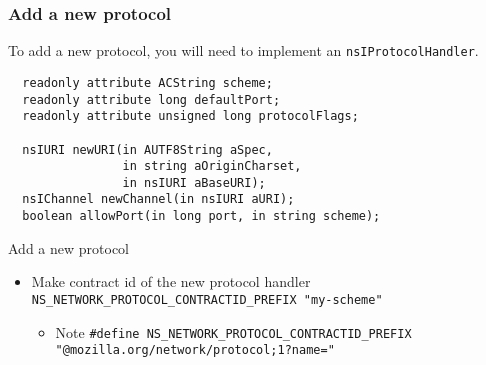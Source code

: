 \documentclass{beamer}
\begin{document}
\begin{frame}[fragile]
  \frametitle{Add a new protocol}
  To add a new protocol, you will need to implement an \texttt{nsIProtocolHandler}.
\begin{verbatim}
  readonly attribute ACString scheme;
  readonly attribute long defaultPort;
  readonly attribute unsigned long protocolFlags;

  nsIURI newURI(in AUTF8String aSpec,
                in string aOriginCharset,
                in nsIURI aBaseURI);
  nsIChannel newChannel(in nsIURI aURI);
  boolean allowPort(in long port, in string scheme);
\end{verbatim}
\end{frame}

\begin{frame}{Add a new protocol}
  \begin{itemize}
  \item Make contract id of the new protocol handler \texttt{NS\_NETWORK\_PROTOCOL\_CONTRACTID\_PREFIX "my-scheme"}
    \begin{itemize}
    \item Note \texttt{\#define NS\_NETWORK\_PROTOCOL\_CONTRACTID\_PREFIX "@mozilla.org/network/protocol;1?name="}
    \end{itemize}
  \end{itemize}
\end{frame}

\end{document}
